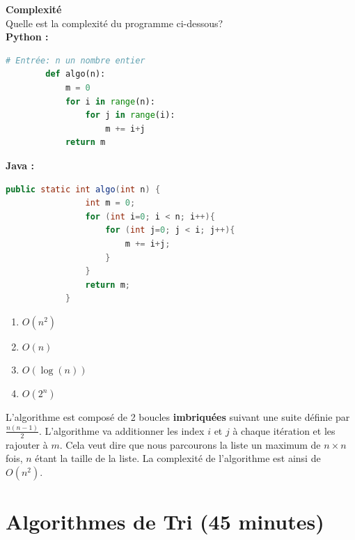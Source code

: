 \newpage

\begin{Exercice}[10 minutes] \textbf{Complexité \optionnel} \\
    Quelle est la complexité du programme ci-dessous?\\
        \textbf{Python :}
        \begin{lstlisting}[language=Python]
        # Entrée: n un nombre entier
        def algo(n):
            m = 0
            for i in range(n):
                for j in range(i):
                    m += i+j
            return m
        \end{lstlisting}
        
        \textbf{Java :}
        \begin{lstlisting}[language=Java]
            public static int algo(int n) {
                int m = 0;
                for (int i=0; i < n; i++){
                    for (int j=0; j < i; j++){
                        m += i+j;
                    }
                }
                return m;
            }
        \end{lstlisting}
    
        \begin{enumerate}
            \item $O(n^2)$
            \item $O(n)$
            \item $O(\log(n))$
            \item $O(2^n)$
        \end{enumerate}

    \begin{solution} 
    L'algorithme est composé de 2 boucles \textbf{imbriquées} suivant une suite définie par $\frac{n(n-1)}{2}$. L'algorithme va additionner les index $i$ et $j$ à chaque itération et les rajouter à $m$.
    Cela veut dire que nous parcourons la liste un maximum de $n \times n$ fois, $n$ étant la taille de la liste. La complexité de l'algorithme est ainsi de $O(n^2)$.
    \end{solution}
    
\end{Exercice}

\section{Algorithmes de Tri (45 minutes)}

